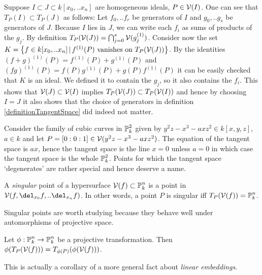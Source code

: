 \begin{example}
Suppose $I \subset J \subset k[x_0,..x_n]$ are homogeneous ideals, $P \in \operatorname{\mathcal V}(I)$.
One can see that $T_P(I) \subset T_P(J)$ as follows: Let $f_0,..f_r$ be generators of $I$ and $g_0,..g_s$ be generators of $J$.
Because $I$ lies in $J$, we can write each $f_i$ as sums of products of the $g_j$.
By definition $T_P(\operatorname{\mathcal V}(J)) = \bigcap_{j=0}^s \operatorname{\mathcal V}(g_j^{(1)})$.
Consider now the set $K = \left\lbrace f \in k[x_0,..x_n] \,|\, f^{(1)}(P) \text{ vanishes on }T_P(\operatorname{\mathcal V}(J))\right\rbrace$.
By the identities $(f+g)^{(1)}(P) = f^{(1)}(P) + g^{(1)}(P)$ and $(fg)^{(1)}(P) = f(P)g^{(1)}(P) + g(P)f^{(1)}(P)$ it can be easily checked that $K$ is an ideal.
We defined it to contain the $g_j$, so it also contains the $f_i$.
This shows that $\operatorname{\mathcal V}(J) \subset \operatorname{\mathcal V}(I)$ implies $T_P(\operatorname{\mathcal V}(J)) \subset T_P(\operatorname{\mathcal V}(I))$ and hence by choosing $I=J$ it also shows that the choice of generators in definition \ref{definitionTangentSpace} did indeed not matter.
\end{example}

\begin{example}
Consider the family of cubic curves in $\operatorname{\mathbb P}^2_k$ given by $y^2z - x^3 - axz^2 \in k[x,y,z]$, $a \in k$ and let $P = [0:0:1] \in \operatorname{\mathcal V}(y^2z - x^3 - axz^2)$.
The equation of the tangent space is $ax$, hence the tangent space is the line $x = 0$ unless $a = 0$ in which case the tangent space is the whole $\operatorname{\mathbb P}^2_k$.
Points for which the tangent space `degenerates' are rather special and hence deserve a name.
\end{example}


\begin{definition}
A \emph{singular} point of a hypersurface $\operatorname{\mathcal V}(f) \subset \operatorname{\mathbb P}^n_k$ is a point in $\V(f,\del_{x_0}f,..\del_{x_n}f)$.
In other words, a point $P$ is singular iff $T_P(\operatorname{\mathcal V}(f)) = \operatorname{\mathbb P}^n_k$.
\end{definition}

Singular points are worth studying because they behave well under automorphisms of projective space.

\begin{proposition} \label{propositionTangentTransform}
Let $\phi : \operatorname{\mathbb P}^n_k \to \operatorname{\mathbb P}^n_k$ be a projective transformation.
Then $\phi(T_P(\operatorname{\mathcal V}(f))) = T_{\phi(P)}(\phi(\operatorname{\mathcal V}(f)))$.
\end{proposition}

This is actually a corollary of a more general fact about \emph{linear embeddings}.

